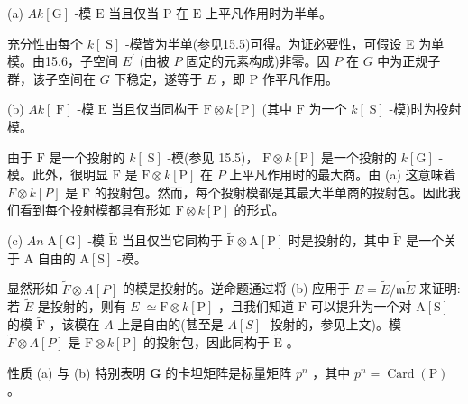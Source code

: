 \documentclass[10pt]{article}
\begin{document}
(a) \({Ak}\left\lbrack  \mathrm{G}\right\rbrack\) -模 \(\mathrm{E}\) 当且仅当 \(\mathrm{P}\) 在 \(\mathrm{E}\) 上平凡作用时为半单。

充分性由每个 \(k\left\lbrack  \mathrm{\;S}\right\rbrack\) -模皆为半单(参见15.5)可得。为证必要性，可假设 E 为单模。由15.6，子空间 \({E}^{\prime }\) (由被 \(P\) 固定的元素构成)非零。因 \(P\) 在 \(G\) 中为正规子群，该子空间在 \(G\) 下稳定，遂等于 \(E\) ，即 \(\mathrm{P}\) 作平凡作用。

(b) \({Ak}\left\lbrack  \mathrm{\;F}\right\rbrack\) -模 \(\mathrm{E}\) 当且仅当同构于 \(\mathrm{F} \otimes  k\left\lbrack  \mathrm{P}\right\rbrack\) (其中 \(\mathrm{F}\) 为一个 \(k\left\lbrack  \mathrm{\;S}\right\rbrack\) -模)时为投射模。

由于 \(\mathrm{F}\) 是一个投射的 \(k\left\lbrack  \mathrm{\;S}\right\rbrack\) -模(参见 15.5)， \(\mathrm{F} \otimes  k\left\lbrack  \mathrm{P}\right\rbrack\) 是一个投射的 \(k\left\lbrack  \mathrm{G}\right\rbrack\) -模。此外，很明显 \(\mathrm{F}\) 是 \(\mathrm{F} \otimes  k\left\lbrack  \mathrm{P}\right\rbrack\) 在 \(P\) 上平凡作用时的最大商。由 (a) 这意味着 \(F \otimes  k\left\lbrack  P\right\rbrack\) 是 F 的投射包。然而，每个投射模都是其最大半单商的投射包。因此我们看到每个投射模都具有形如 \(\mathrm{F} \otimes  k\left\lbrack  \mathrm{P}\right\rbrack\) 的形式。

(c) \({An}\mathrm{\;A}\left\lbrack  \mathrm{G}\right\rbrack\) -模 \(\widetilde{\mathrm{E}}\) 当且仅当它同构于 \(\widetilde{\mathrm{F}} \otimes  \mathrm{A}\left\lbrack  \mathrm{P}\right\rbrack\) 时是投射的，其中 \(\widetilde{\mathrm{F}}\) 是一个关于 A 自由的 \(\mathrm{A}\left\lbrack  \mathrm{S}\right\rbrack\) -模。

显然形如 \(\widetilde{F} \otimes  A\left\lbrack  P\right\rbrack\) 的模是投射的。逆命题通过将 (b) 应用于 \(E = \widetilde{E}/\mathfrak{m}\widetilde{E}\) 来证明:若 \(\widetilde{E}\) 是投射的，则有 \(E \; \simeq  \mathrm{F} \otimes  k\left\lbrack  \mathrm{P}\right\rbrack\) ，且我们知道 \(\mathrm{F}\) 可以提升为一个对 \(\mathrm{A}\left\lbrack  \mathrm{S}\right\rbrack\) 的模 \(\widetilde{\mathrm{F}}\) ，该模在 \(A\) 上是自由的(甚至是 \(A\left\lbrack  S\right\rbrack\) -投射的，参见上文)。模 \(\widetilde{F} \otimes  A\left\lbrack  P\right\rbrack\) 是 \(\mathrm{F} \otimes  k\left\lbrack  \mathrm{P}\right\rbrack\) 的投射包，因此同构于 \(\widetilde{\mathrm{E}}\) 。

性质 (a) 与 (b) 特别表明 \(\mathbf{G}\) 的卡坦矩阵是标量矩阵 \({p}^{n}\) ，其中 \({p}^{n} = \operatorname{Card}\left( \mathrm{P}\right)\) 。
\end{document}
